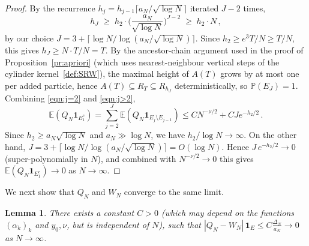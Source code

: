 \documentclass[11pt,a4paper,reqno]{amsart}
\newtheorem{Lemma}[Theorem]{Lemma}
\theoremstyle{definition}
\newcommand{\bbE}{{\ensuremath{\mathbb E}} }
\newcommand{\bbP}{{\ensuremath{\mathbb P}} }
\begin{document}
\begin{proof}
By the recurrence $h_j = h_{j-1}\lceil a_N/\sqrt{\log N}\rceil$ iterated $J-2$ times,
$$ h_J \;\geq\; h_2 \cdot \Big(\frac{a_N}{\sqrt{\log N}}\Big)^{J-2} \;\geq\; h_2 \cdot N\,, $$
by our choice $J = 3 + \lceil \log N / \log(a_N/\sqrt{\log N})\rceil$. Since $h_2 \geq e^3 T/N \geq T/N$, this gives $h_J \geq N \cdot T/N = T$.
By the ancestor-chain argument used in the proof of Proposition~\ref{pr:apriori} (which uses nearest-neighbour vertical steps of the cylinder kernel~\eqref{def:SRW}), the maximal height of $A(T)$ grows by at most one per added particle, hence $A(T) \subseteq R_T \subseteq R_{h_J}$ deterministically, so $\bbP(E_J) = 1$.
Combining \eqref{eqn:j=2} and \eqref{eqn:j>2},
$$ \bbE ( Q_N \mathbf{1}_{E_1^c} ) = \sum_{j=2}^J \bbE ( Q_N \mathbf{1}_{E_j \setminus E_{j-1} }  )
\leq C N^{-\nu/2} + C J e^{- h_2 /2 }\,. $$
Since $h_2 \geq a_N \sqrt{\log N}$ and $a_N \gg \log N$, we have $h_2 / \log N \to \infty$. On the other hand, $J = 3 + \lceil \log N / \log(a_N/\sqrt{\log N}) \rceil = O(\log N)$. Hence $J\, e^{-h_2/2} \to 0$ (super-polynomially in $N$), and combined with $N^{-\nu/2} \to 0$ this gives $\bbE(Q_N \mathbf{1}_{E_1^c}) \to 0$ as $N \to \infty$.
\end{proof}


We next show that $Q_N$ and $W_N$ converge to the same limit.
\begin{Lemma}
\label{clm:Q-W}
There exists a constant $C>0$ (which may depend on the functions $(\alpha_k)_k$
and $y_0, \nu$, but is independent of $N$), such that
$|Q_N - W_N|\, \mathbf{1}_{E} \leq C \frac{\Delta_N}{a_N} \to 0$
as $N \to \infty$.
\end{Lemma}
\end{document}
